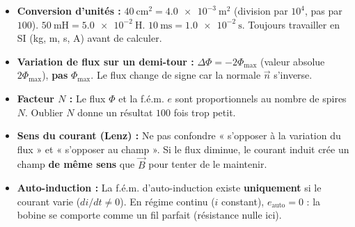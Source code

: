 \documentclass[11pt]{article}
\begin{document}
\begin{attention}
\begin{itemize}
\item \textbf{Conversion d'unités :} $40~\text{cm}^2 = \num{4,0e-3}~\text{m}^2$ (division par $10^4$, pas par $100$). $50~\text{mH} = \num{5,0e-2}~\text{H}$. $10~\text{ms} = \num{1,0e-2}~\text{s}$. Toujours travailler en SI (kg, m, s, A) avant de calculer.
\item \textbf{Variation de flux sur un demi-tour :} $\Delta\Phi = -2\Phi_{\max}$ (valeur absolue $2\Phi_{\max}$), \textbf{pas} $\Phi_{\max}$. Le flux change de signe car la normale $\vec{n}$ s'inverse.
\item \textbf{Facteur $N$ :} Le flux $\Phi$ et la f.é.m. $e$ sont proportionnels au nombre de spires $N$. Oublier $N$ donne un résultat $100$ fois trop petit.
\item \textbf{Sens du courant (Lenz) :} Ne pas confondre « s'opposer à la variation du flux » et « s'opposer au champ ». Si le flux diminue, le courant induit crée un champ \textbf{de même sens} que $\vec{B}$ pour tenter de le maintenir.
\item \textbf{Auto-induction :} La f.é.m. d'auto-induction existe \textbf{uniquement} si le courant varie ($di/dt \neq 0$). En régime continu ($i$ constant), $e_{\text{auto}} = 0$ : la bobine se comporte comme un fil parfait (résistance nulle ici).
\end{itemize}
\end{attention}
\end{document}
